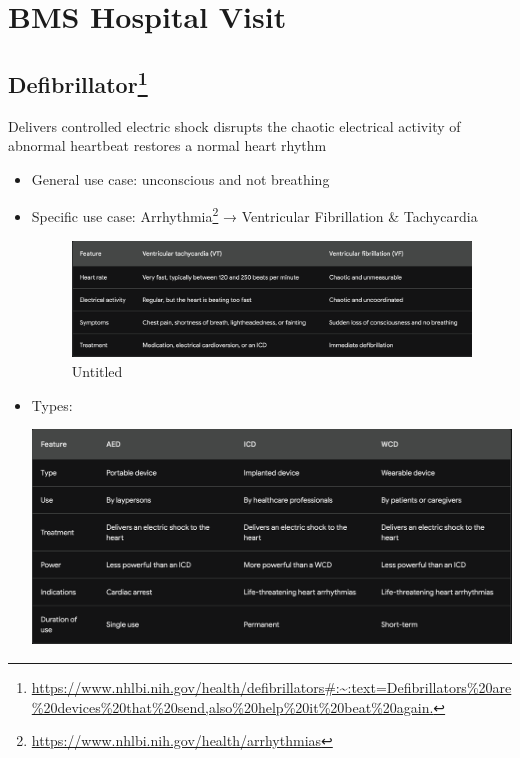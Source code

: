 \documentclass[
  11pt,
  letterpaper,
  DIV=11,
  numbers=noendperiod]{scrreprt}
\DeclareRobustCommand{\href}[2]{#2\footnote{\url{#1}}}
\begin{document}
\chapter{BMS Hospital Visit}\label{bms-hospital-visit}

\section{\texorpdfstring{\href{https://www.nhlbi.nih.gov/health/defibrillators\#:~:text=Defibrillators\%20are\%20devices\%20that\%20send,also\%20help\%20it\%20beat\%20again.}{Defibrillator}}{Defibrillator}}\label{defibrillator}

Delivers controlled electric shock \textbar{} disrupts the chaotic
electrical activity of abnormal heartbeat \textbar{} restores a normal
heart rhythm

\begin{itemize}
\item
  General use case: unconscious and not breathing
\item
  Specific use case:
  \href{https://www.nhlbi.nih.gov/health/arrhythmias}{Arrhythmia} →
  Ventricular Fibrillation \& Tachycardia

  \begin{figure}[H]

  {\centering \includegraphics{Beyond the Sterile Walls e0cff5645ec24545a8c247940fff8e84/Untitled.png}

  }

  \caption{Untitled}

  \end{figure}%
\item
  Types:

  \includegraphics[width=5.25in,height=\textheight]{Beyond the Sterile Walls e0cff5645ec24545a8c247940fff8e84/Untitled 1.png}
\end{itemize}
\end{document}
